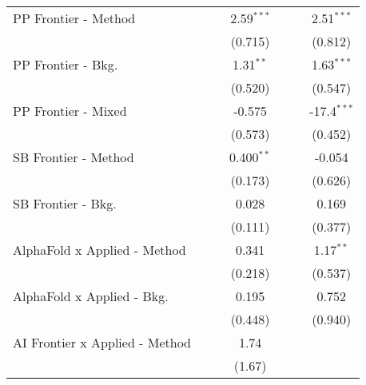 \begin{tabular}{lcccccc}
   PP Frontier - Method           &                &               & 2.59$^{***}$  &                &               & 2.51$^{***}$\\   
                                  &                &               & (0.715)       &                &               & (0.812)\\   
   PP Frontier - Bkg.             &                &               & 1.31$^{**}$   &                &               & 1.63$^{***}$\\   
                                  &                &               & (0.520)       &                &               & (0.547)\\   
   PP Frontier - Mixed            &                &               & -0.575        &                &               & -17.4$^{***}$\\   
                                  &                &               & (0.573)       &                &               & (0.452)\\   
   SB Frontier - Method           &                &               & 0.400$^{**}$  &                &               & -0.054\\   
                                  &                &               & (0.173)       &                &               & (0.626)\\   
   SB Frontier - Bkg.             &                &               & 0.028         &                &               & 0.169\\   
                                  &                &               & (0.111)       &                &               & (0.377)\\   
   AlphaFold x Applied - Method   &                &               & 0.341         &                &               & 1.17$^{**}$\\   
                                  &                &               & (0.218)       &                &               & (0.537)\\   
   AlphaFold x Applied - Bkg.     &                &               & 0.195         &                &               & 0.752\\   
                                  &                &               & (0.448)       &                &               & (0.940)\\   
   AI Frontier x Applied - Method &                &               & 1.74          &                &               &   \\   
                                  &                &               & (1.67)        &                &               &   \\   

\end{tabular}
